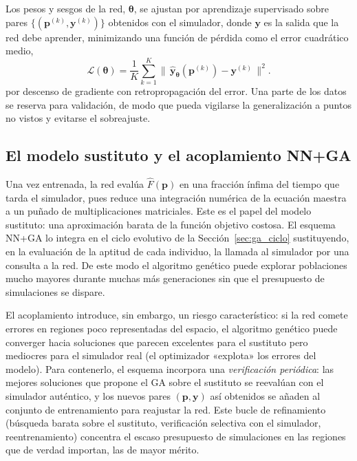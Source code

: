 Los pesos y sesgos de la red, $\boldsymbol{\theta}$, se ajustan por aprendizaje
supervisado sobre pares $\{(\mathbf{p}^{(k)}, \mathbf{y}^{(k)})\}$ obtenidos con el
simulador, donde $\mathbf{y}$ es la salida que la red debe aprender, minimizando una
función de pérdida como el error cuadrático medio,
\begin{equation}
    \mathcal{L}(\boldsymbol{\theta})
    = \frac{1}{K}\sum_{k=1}^{K}
    \bigl\|\,\hat{\mathbf{y}}_{\boldsymbol{\theta}}(\mathbf{p}^{(k)})
    - \mathbf{y}^{(k)}\,\bigr\|^2 .
    \label{eq:perdida_mse}
\end{equation}
por descenso de gradiente con retropropagación del error. Una parte de los datos se
reserva para validación, de modo que pueda vigilarse la generalización a puntos no
vistos y evitarse el sobreajuste.

\subsection{El modelo sustituto y el acoplamiento NN+GA}
\label{sec:surrogate_acoplamiento}

Una vez entrenada, la red evalúa $\hat{F}(\mathbf{p})$ en una fracción ínfima del
tiempo que tarda el simulador, pues reduce una integración numérica de la ecuación
maestra a un puñado de multiplicaciones matriciales. Este es el papel del modelo
sustituto: una aproximación barata de la función objetivo costosa. El esquema NN+GA
lo integra en el ciclo evolutivo de la Sección~\ref{sec:ga_ciclo} sustituyendo, en
la evaluación de la aptitud de cada individuo, la llamada al simulador por una
consulta a la red. De este modo el algoritmo genético puede explorar poblaciones
mucho mayores durante muchas más generaciones sin que el presupuesto de simulaciones
se dispare.

El acoplamiento introduce, sin embargo, un riesgo característico: si la red comete
errores en regiones poco representadas del espacio, el algoritmo genético puede
converger hacia soluciones que parecen excelentes para el sustituto pero mediocres
para el simulador real (el optimizador «explota» los errores del modelo). Para
contenerlo, el esquema incorpora una \emph{verificación periódica}: las mejores
soluciones que propone el GA sobre el sustituto se reevalúan con el simulador
auténtico, y los nuevos pares $(\mathbf{p}, \mathbf{y})$ así obtenidos se añaden
al conjunto de entrenamiento para reajustar la red. Este bucle de refinamiento
(búsqueda barata sobre el sustituto, verificación selectiva con el simulador,
reentrenamiento) concentra el escaso presupuesto de simulaciones en las regiones
que de verdad importan, las de mayor mérito.

